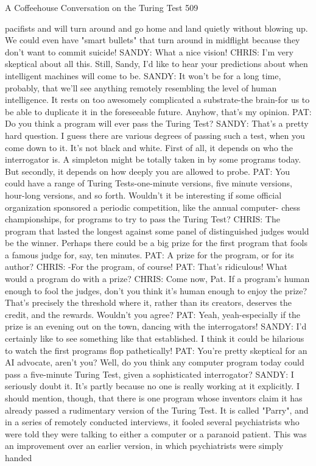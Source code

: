 A Coffeehouse Conversation on the Turing Test                                     509

   pacifists and will turn around and go home and land quietly without blowing up.
   We could even have "smart bullets" that turn around in midflight because they
   don't want to commit suicide!
SANDY: What a nice vision!
CHRIS: I'm very skeptical about all this. Still, Sandy, I'd like to hear your predictions
   about when intelligent machines will come to be.
SANDY: It won't be for a long time, probably, that we'll see anything remotely
   resembling the level of human intelligence. It rests on too awesomely
   complicated a substrate-the brain-for us to be able to duplicate it in the
   foreseeable future. Anyhow, that's my opinion.
PAT: Do you think a program will ever pass the Turing Test?
SANDY: That's a pretty hard question. I guess there are various degrees of passing
   such a test, when you come down to it. It's not black and white. First of all, it
   depends on who the interrogator is. A simpleton might be totally taken in by
   some programs today. But secondly, it depends on how deeply you are allowed
   to probe.
PAT: You could have a range of Turing Tests-one-minute versions, five minute
   versions, hour-long versions, and so forth. Wouldn't it be interesting if some
   official organization sponsored a periodic competition, like the annual computer-
   chess championships, for programs to try to pass the Turing Test?
CHRIS: The program that lasted the longest against some panel of distinguished
   judges would be the winner. Perhaps there could be a big prize for the first
   program that fools a famous judge for, say, ten minutes.
PAT: A prize for the program, or for its author?
CHRIS: -For the program, of course!
PAT: That's ridiculous! What would a program do with a prize?
CHRIS: Come now, Pat. If a program's human enough to fool the judges, don't you
   think it's human enough to enjoy the prize? That's precisely the threshold where
   it, rather than its creators, deserves the credit, and the rewards. Wouldn't you
   agree?
PAT: Yeah, yeah-especially if the prize is an evening out on the town, dancing with
   the interrogators!
SANDY: I'd certainly like to see something like that established. I think it could be
   hilarious to watch the first programs flop pathetically!
PAT: You're pretty skeptical for an AI advocate, aren't you? Well, do you think any
   computer program today could pass a five-minute Turing Test, given a
   sophisticated interrogator?
SANDY: I seriously doubt it. It's partly because no one is really working at it
   explicitly. I should mention, though, that there is one program whose inventors
   claim it has already passed a rudimentary version of the Turing Test. It is called
   "Parry", and in a series of remotely conducted interviews, it fooled several
   psychiatrists who were told they were talking to either a computer or a paranoid
   patient. This was an improvement over an earlier version, in which psychiatrists
   were simply handed




